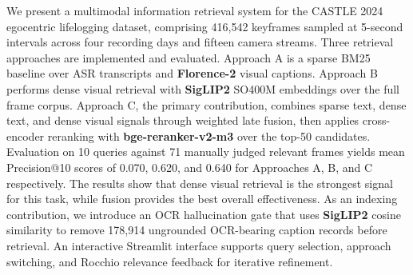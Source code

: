 We present a multimodal information retrieval system for the CASTLE 2024 egocentric lifelogging dataset, comprising 416,542 keyframes sampled at 5-second intervals across four recording days and fifteen camera streams. Three retrieval approaches are implemented and evaluated. Approach A is a sparse BM25 baseline over ASR transcripts and \textbf{Florence-2} visual captions. Approach B performs dense visual retrieval with \textbf{SigLIP2} SO400M embeddings over the full frame corpus. Approach C, the primary contribution, combines sparse text, dense text, and dense visual signals through weighted late fusion, then applies cross-encoder reranking with \textbf{bge-reranker-v2-m3} over the top-50 candidates. Evaluation on 10 queries against 71 manually judged relevant frames yields mean Precision@10 scores of 0.070, 0.620, and 0.640 for Approaches A, B, and C respectively. The results show that dense visual retrieval is the strongest signal for this task, while fusion provides the best overall effectiveness. As an indexing contribution, we introduce an OCR hallucination gate that uses \textbf{SigLIP2} cosine similarity to remove 178,914 ungrounded OCR-bearing caption records before retrieval. An interactive Streamlit interface supports query selection, approach switching, and Rocchio relevance feedback for iterative refinement.

